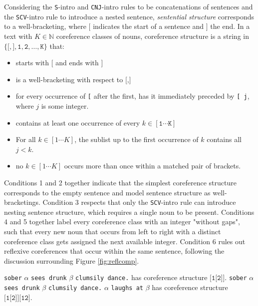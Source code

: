 \begin{defn}\label{defn:corefstruct}
Considering the \texttt{S}-intro and \texttt{CNJ}-intro rules to be concatenations of sentences and the \texttt{SCV}-intro rule to introduce a nested sentence, \emph{sentential structure} corresponds to a well-bracketing, where $\texttt{[}$ indicates the start of a sentence and $\texttt{]}$ the end. In a text with $K \in \mathbb{N}$ coreference classes of nouns, coreference structure is a string in $\{\texttt{[}, \texttt{]}, \texttt{1}, \texttt{2}, \ldots, \texttt{K}\}$ that:
\begin{itemize}
\item starts with $\texttt{[}$ and ends with $\texttt{]}$
\item is a well-bracketing with respect to $\texttt{[},\texttt{]}$
\item for every occurrence of \texttt{[} after the first, has it immediately preceded by \texttt{[ j}, where $j$ is some integer.
\item contains at least one occurrence of every $k \in [\texttt{1} \cdots \texttt{K}]$
\item For all $k \in [1 \cdots K]$, the sublist up to the first occurrence of $k$ contains all $j < k$.
\item no $k \in [1 \cdots K]$ occurs more than once within a matched pair of brackets.
\end{itemize}
Conditions 1 and 2 together indicate that the simplest coreference structure corresponds to the empty sentence and model sentence structure as well-bracketings. Condition 3 respects that only the \texttt{SCV}-intro rule can introduce nesting sentence structure, which requires a single noun to be present. Conditions 4 and 5 together label every coreference class with an integer "without gaps", such that every new noun that occurs from left to right with a distinct coreference class gets assigned the next available integer. Condition 6 rules out reflexive coreferences that occur within the same sentence, following the discussion surrounding Figure \ref{fig:reflcomp}.
\end{defn}

\begin{example}\label{ex:corefex}
\texttt{sober} $\alpha$ \texttt{sees drunk} $\beta$ \texttt{clumsily dance.} has coreference structure $\texttt{[1[2]]}$. \texttt{sober} $\alpha$ \texttt{sees drunk} $\beta$ \texttt{clumsily dance.} $\alpha$ \texttt{laughs at} $\beta$ has coreference structure $\texttt{[1[2]][12]}$.
\end{example}

